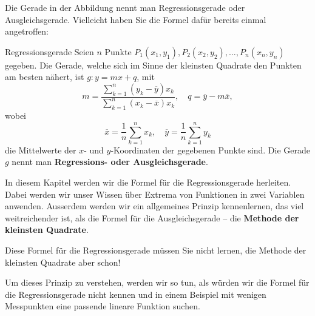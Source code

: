 Die Gerade in der Abbildung nennt man Regressionsgerade oder Ausgleichsgerade. Vielleicht haben Sie die Formel dafür bereits einmal angetroffen:

\begin{satz}
{Regressionsgerade}{}
Seien \( n \) Punkte \( P_1 (x_1, y_1), P_2 (x_2, y_2), \dots, P_n (x_n, y_n) \) gegeben.  
Die Gerade, welche sich im Sinne der kleinsten Quadrate den Punkten am besten nähert, ist \( g: y = mx + q \), mit  
\[
m = \frac{\sum_{k=1}^n (y_k - \overline{y}) x_k}{\sum_{k=1}^n (x_k - \overline{x}) x_k}, \quad q = \overline{y} - m \overline{x},
\]
wobei  
\[
\overline{x} = \frac{1}{n} \sum_{k=1}^n x_k, \quad \overline{y} = \frac{1}{n} \sum_{k=1}^n y_k
\]
die Mittelwerte der \( x \)- und \( y \)-Koordinaten der gegebenen Punkte sind.  
Die Gerade \( g \) nennt man \textbf{Regressions- oder Ausgleichsgerade}.
\end{satz}


In diesem Kapitel werden wir die Formel für die Regressionsgerade herleiten. Dabei werden wir unser Wissen über Extrema von Funktionen in zwei Variablen anwenden. Ausserdem werden wir ein allgemeines Prinzip kennenlernen, das viel weitreichender ist, als die Formel für die Ausgleichsgerade – die \textbf{Methode der kleinsten Quadrate}.

Diese Formel für die Regressionsgerade müssen Sie nicht lernen, die Methode der kleinsten Quadrate aber schon!

Um dieses Prinzip zu verstehen, werden wir so tun, als würden wir die Formel für die Regressionsgerade nicht kennen und in einem Beispiel mit wenigen Messpunkten eine passende lineare Funktion suchen.















